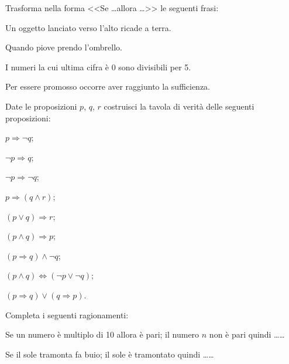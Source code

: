 \begin{esercizio}
\label{ese:6.13}
Trasforma nella forma <<Se \ldots allora \ldots>> le seguenti frasi:
\begin{enumeratea}
\item Un oggetto lanciato verso l'alto ricade a terra.
\item Quando piove prendo l'ombrello.
\item I numeri la cui ultima cifra è 0 sono divisibili per 5.
\item Per essere promosso occorre aver raggiunto la sufficienza.
\end{enumeratea}
\end{esercizio}

\begin{esercizio}
\label{ese:6.14}
Date le proposizioni $ p $, $ q $, $ r $ costruisci la tavola di verità delle
seguenti proposizioni:
 \begin{multicols}{3}
 \begin{enumeratea}
 \item $p\Rightarrow \neg q$;
 \item $\neg p\Rightarrow q$;
 \item $\neg p\Rightarrow \neg q$;
 \item $p\Rightarrow (q\wedge r)$;
 \item $(p\vee q)\Rightarrow r$;
 \item $(p\wedge q)\Rightarrow p$;
 \item $(p\Rightarrow q)\wedge \neg q$;
 \item $(p\wedge q)\Leftrightarrow (\neg p\vee \neg q)$;
 \item $(p\Rightarrow q)\vee (q\Rightarrow p)$.
 \end{enumeratea}
 \end{multicols}
\end{esercizio}

\begin{esercizio}
\label{ese:6.15}
Completa i seguenti ragionamenti:
\begin{enumeratea}
\item Se un numero è multiplo di 10 allora è pari; il numero $ n $ non è pari quindi \ldots \ldots
\item Se il sole tramonta fa buio; il sole è tramontato quindi \ldots \ldots
\end{enumeratea}
\end{esercizio}

